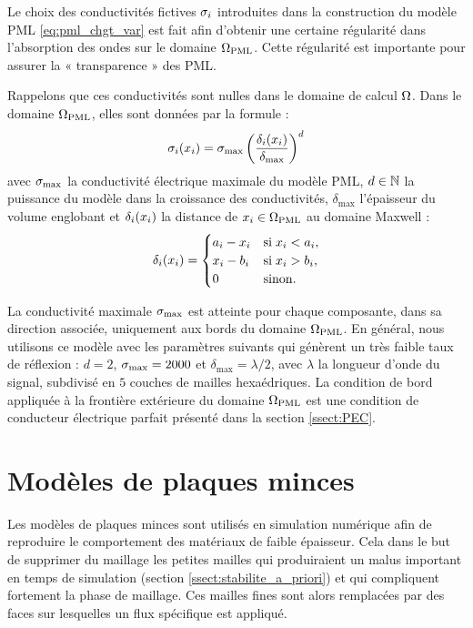 Le choix des conductivités fictives $\sigma_i$ introduites
dans la construction du modèle PML \eqref{eq:pml_chgt_var} est fait
afin d'obtenir une certaine régularité dans l’absorption des ondes
sur le domaine $\Omega_{\mathrm{PML}}$.
Cette régularité est importante pour assurer la « transparence » des PML.

Rappelons que ces conductivités sont nulles dans le domaine de calcul
$\Omega$. Dans le domaine $\Omega_{\mathrm{PML}}$, elles sont
données par la formule :
\begin{align}
	\sigma_i(x_i) =
	\sigma_{\max} \left(\frac{\delta_i(x_i)}{\delta_{\max}}\right)^d
\end{align}
avec $\sigma_{\max}$ la conductivité électrique maximale du modèle PML,
$d \in \mathbb{N}$ la puissance du modèle dans la croissance des
conductivités, $\delta_{\max}$ l'épaisseur
du volume englobant et $\delta_i(x_i)$ la distance de
$x_i \in \Omega_{\mathrm{PML}}$ au domaine Maxwell :
\begin{align}
	\delta_i(x_i) =
	\begin{cases}
		a_i - x_i &
			\mathrm{si} \; x_i < a_i , \\
		x_i - b_i &
			\mathrm{si} \; x_i > b_i , \\
		0 & \mathrm{sinon} .
	\end{cases}
\end{align}

La conductivité maximale $\sigma_{\max}$ est atteinte pour chaque
composante, dans sa direction associée,
uniquement aux bords du domaine $\Omega_{\mathrm{PML}}$.
En général, nous utilisons ce modèle avec les paramètres suivants
qui génèrent un très faible taux de réflexion :
$d = 2$, $\sigma_{\max} = 2000$ et $\delta_{\max} = \lambda / 2$,
avec $\lambda$ la longueur d'onde du signal, subdivisé
en $5$ couches de mailles hexaédriques.
La condition de bord appliquée à la frontière extérieure du
domaine $\Omega_{\mathrm{PML}}$ est une condition
de conducteur électrique parfait présenté dans la section \ref{ssect:PEC}.
\\




\section{Modèles de plaques minces}
\label{sect:plaques_minces}

Les modèles de plaques minces sont utilisés en simulation numérique
afin de reproduire le comportement des matériaux de faible épaisseur.
Cela dans le but de supprimer du maillage les petites mailles
qui produiraient un malus important en temps de simulation
(section \ref{ssect:stabilite_a_priori}) et qui
compliquent fortement la phase de maillage.
Ces mailles fines sont alors remplacées par des faces sur lesquelles
un flux spécifique est appliqué.

